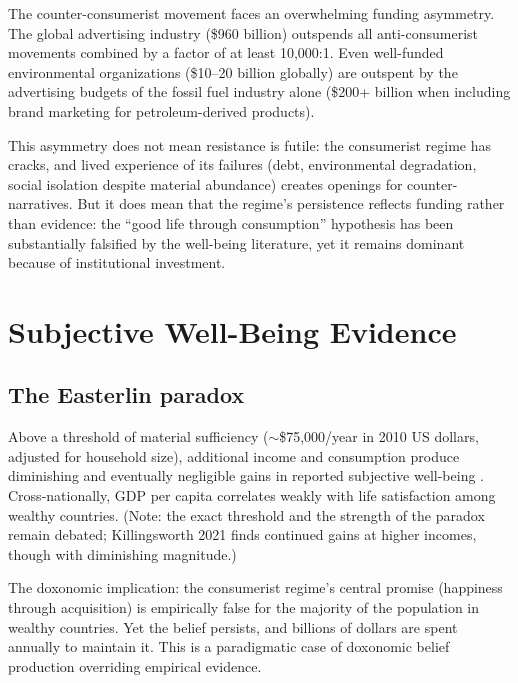 The counter-consumerist movement faces an overwhelming funding asymmetry.
The global advertising industry (\$960 billion) outspends all anti-consumerist movements combined by a factor of at least 10,000:1.
Even well-funded environmental organizations (\$10--20 billion globally) are outspent by the advertising budgets of the fossil fuel industry alone (\$200+ billion when including brand marketing for petroleum-derived products).

This asymmetry does not mean resistance is futile: the consumerist regime has cracks, and lived experience of its failures (debt, environmental degradation, social isolation despite material abundance) creates openings for counter-narratives.
But it does mean that the regime's persistence reflects funding rather than evidence: the ``good life through consumption'' hypothesis has been substantially falsified by the well-being literature, yet it remains dominant because of institutional investment.

\section{Subjective Well-Being Evidence}
\label{sec:ch23-wellbeing}

\subsection{The Easterlin paradox}

\begin{remark}
\label{prop:easterlin}
Above a threshold of material sufficiency ($\sim$\$75,000/year in 2010 US dollars, adjusted for household size), additional income and consumption produce diminishing and eventually negligible gains in reported subjective well-being \autocite{easterlin1974}.
Cross-nationally, GDP per capita correlates weakly with life satisfaction among wealthy countries.
(Note: the exact threshold and the strength of the paradox remain debated; Killingsworth 2021 finds continued gains at higher incomes, though with diminishing magnitude.)
\end{remark}

The doxonomic implication: the consumerist regime's central promise (happiness through acquisition) is empirically false for the majority of the population in wealthy countries.
Yet the belief persists, and billions of dollars are spent annually to maintain it.
This is a paradigmatic case of doxonomic belief production overriding empirical evidence.

